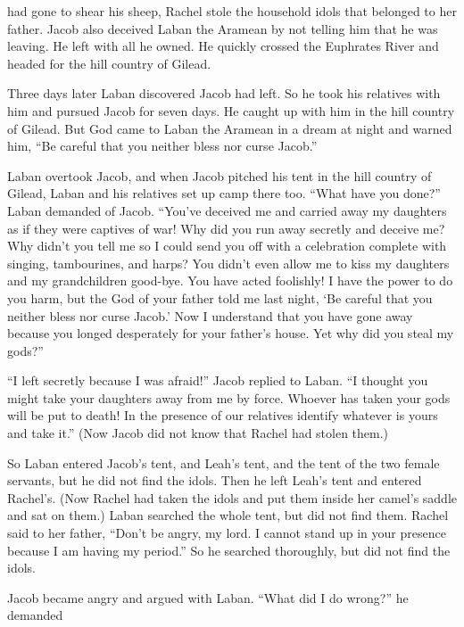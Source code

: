 {had gone
to shear
his sheep,
Rachel
stole
the household idols
that
belonged to her father.
Jacob
also deceived
Laban
the Aramean
by not telling
him that
he was leaving.
He left
with all
he owned.
He quickly crossed
the Euphrates
River and headed
for the hill country
of Gilead.
\par }{\PP {}Three days
later
Laban
discovered
Jacob
had left.
So he took
his relatives
with
him and pursued
Jacob for seven
days.
He caught
up with him in the hill country
of Gilead.
But God
came
to
Laban
the Aramean
in a dream
at night
and warned
him, “Be careful
that you
neither
bless nor curse
Jacob.”
\par }{\PP {}Laban
overtook
Jacob,
and when
Jacob
pitched
his tent
in the hill country
of Gilead,
Laban
and his relatives
set up camp there too.
“What
have you done?” Laban
demanded of Jacob.
“You’ve
deceived me and carried away my daughters
as if they were captives
of war!
Why
did you run away
secretly
and deceive
me? Why didn’t
you tell
me so I could send
you off with a celebration
complete with singing,
tambourines,
and harps?
You didn’t even allow me
to kiss
my daughters
and my grandchildren
good-bye. You have acted
foolishly!
I have
the power
to do
you
harm,
but the God
of your father
told
me last night,
‘Be careful
that you neither
bless nor curse
Jacob.’
Now
I understand that you have gone
away
because
you longed
desperately
for your father’s
house.
Yet
why
did you steal
my gods?”
\par }{\PP {}“I left secretly
because
I was afraid!” Jacob
replied
to Laban.
“I thought you might
take your daughters
away
from me by force.
Whoever has
taken
your gods
will be put to death! In the presence
of our relatives
identify
whatever
is yours
and take
it.” (Now Jacob
did not
know
that
Rachel
had stolen them.)
\par }{\PP {}So Laban
entered
Jacob’s
tent,
and Leah’s
tent,
and the tent
of the two
female servants,
but he did not
find
the idols. Then he left
Leah’s
tent
and entered
Rachel’s.
(Now Rachel
had taken
the idols
and put
them inside her camel’s
saddle and sat
on
them.) Laban
searched
the whole
tent,
but did not
find them.
Rachel said
to
her father,
“Don’t
be angry,
my lord.
I cannot
stand up
in your presence
because
I am having
my period.”
So he searched
thoroughly, but did not
find
the idols.
\par }{\PP {}Jacob
became angry
and argued
with Laban.
“What
did I do wrong?” he demanded
}
